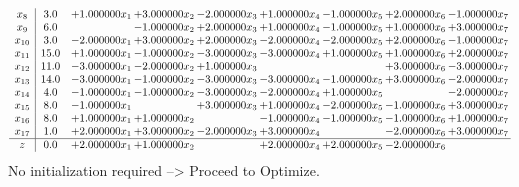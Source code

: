 \documentclass[10pt]{article}
\begin{document}
\[\begin{array}{c| c c@{\hskip 2pt} c@{\hskip 2pt} c@{\hskip 2pt} c@{\hskip 2pt} c@{\hskip 2pt} c@{\hskip 2pt} c@{\hskip 2pt} }
 x_{8}   &  3.0 & + 1.000000 x_{1} & + 3.000000 x_{2} & -2.000000 x_{3} & + 1.000000 x_{4} & -1.000000 x_{5} & + 2.000000 x_{6} & -1.000000 x_{7}\\
 x_{9}   &  6.0  &   & -1.000000 x_{2} & + 2.000000 x_{3} & + 1.000000 x_{4} & -1.000000 x_{5} & + 1.000000 x_{6} & + 3.000000 x_{7}\\
 x_{10}   &  3.0 & -2.000000 x_{1} & + 3.000000 x_{2} & + 2.000000 x_{3} & -2.000000 x_{4} & -2.000000 x_{5} & + 2.000000 x_{6} & -1.000000 x_{7}\\
 x_{11}   &  15.0 & + 1.000000 x_{1} & -1.000000 x_{2} & -3.000000 x_{3} & -3.000000 x_{4} & + 1.000000 x_{5} & + 1.000000 x_{6} & + 2.000000 x_{7}\\
 x_{12}   &  11.0 & -3.000000 x_{1} & -2.000000 x_{2} & + 1.000000 x_{3} &    &   & + 3.000000 x_{6} & -3.000000 x_{7}\\
 x_{13}   &  14.0 & -3.000000 x_{1} & -1.000000 x_{2} & -3.000000 x_{3} & -3.000000 x_{4} & -1.000000 x_{5} & + 3.000000 x_{6} & -2.000000 x_{7}\\
 x_{14}   &  4.0 & -1.000000 x_{1} & -1.000000 x_{2} & -3.000000 x_{3} & -2.000000 x_{4} & + 1.000000 x_{5} &   & -2.000000 x_{7}\\
 x_{15}   &  8.0 & -1.000000 x_{1} &   & + 3.000000 x_{3} & + 1.000000 x_{4} & -2.000000 x_{5} & -1.000000 x_{6} & + 3.000000 x_{7}\\
 x_{16}   &  8.0 & + 1.000000 x_{1} & + 1.000000 x_{2} &   & -1.000000 x_{4} & -1.000000 x_{5} & -1.000000 x_{6} & + 1.000000 x_{7}\\
 x_{17}   &  1.0 & + 2.000000 x_{1} & + 3.000000 x_{2} & -2.000000 x_{3} & + 3.000000 x_{4} &   & -2.000000 x_{6} & + 3.000000 x_{7}\\
\hline
z    &  0.0 & + 2.000000 x_{1} & + 1.000000 x_{2} &   & + 2.000000 x_{4} & + 2.000000 x_{5} & -2.000000 x_{6} &   \\
\end{array}\]
No initialization required --> Proceed to Optimize. 
\end{document}
